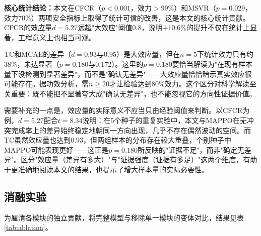 \documentclass[12pt,a4paper,UTF8]{ctexart}
\begin{document}
\textbf{核心统计结论：}本文在CFCR（$p<0.001$，效力$>99\%$）和MSVR（$p=0.029$，效力70\%）两项安全指标上取得了统计可信的改善，这是本文的核心统计贡献。CFCR的效应量$d=5.27$远超"大效应"阈值0.8，说明$+10.6\%$的提升不仅在统计上显著，工程意义上也相当可观。

TC和MCAE的差异（$d=0.93$与0.95）是大效应量，但在$n=5$下统计效力只有约38\%，未达显著（$p=0.180$与0.172）。这里的$p=0.180$要恰当解读为"在现有样本量下没检测到显著差异"，而不是"确认无差异"——大效应量恰恰暗示真实效应很可能存在。据功效分析，需$n\geq20$才让检验达到80\%效力。这个区分对科学解读至关重要：既不能把不显著夸大成"确认无差异"，也不能忽视它的方向性证据价值。

需要补充的一点是，效应量的实际意义不应当只由经验阈值来判断。以CFCR为例，$d=5.27$配合$t=8.34$说明：在5个种子的重复实验中，本文与MAPPO在无冲突完成率上的差异始终稳定地朝同一方向出现，几乎不存在偶然波动的空间。而TC虽然效应量也达到0.93，但两组样本的分布存在较大重叠，个别种子中MAPPO可能表现更好——这正是$p=0.180$所反映的"证据不足"，而非"确定无差异"。区分"效应量（差异有多大）"与"证据强度（证据有多足）"这两个维度，有助于更准确地阅读本文的结果，也提示了增大样本量的实际必要性。

\subsection{消融实验}

为厘清各模块的独立贡献，将完整模型与移除单一模块的变体对比，结果见表\ref{tab:ablation}。

\begin{table}[H]
    \centering
    \caption{消融实验（$n=5$）}
    \label{tab:ablation}
\end{table}
\end{document}
